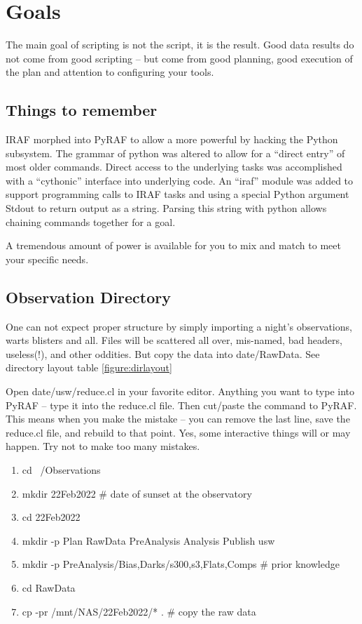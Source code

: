 \section{Goals}

The main goal of scripting is not the script, it is the result. Good
data results do not come from good scripting -- but come from good
planning, good execution of the plan and attention to configuring
your tools.


\subsection{Things to remember}

IRAF  morphed into PyRAF \cite{2006hstc.conf..437G} to allow a more
powerful  by hacking the Python  subsystem. The
grammar of python was altered to allow for a ``direct entry'' of most older
 commands. Direct access to the underlying tasks was
accomplished with a ``cythonic'' interface into underlying code. An ``iraf''
module was added to support programming calls to IRAF tasks and using 
a special Python  argument Stdout to return output as a string.
Parsing this string with python allows chaining  commands together
for a goal.

A tremendous amount of power is available for you to mix and match to meet
your specific needs. 

\subsection{Observation Directory}

One can not expect proper structure by simply importing a night's
observations, warts blisters and all. Files will be scattered all
over, mis-named, bad headers, useless(!), and other oddities. But copy
the data into date/RawData. See directory layout table \ref{figure:dirlayout}

Open date/usw/reduce.cl in your favorite editor. Anything you want
to type into PyRAF -- type it into the reduce.cl file. Then cut/paste
the command to PyRAF. This means when you make the mistake -- you
can remove the last line, save the reduce.cl file, and rebuild
to that point. Yes, some interactive things will or may happen.
Try not to make too many mistakes.

\vspace{-.15cm}
\begin{enumerate}\addtolength{\itemsep}{-0.5\baselineskip}
   \item   cd ~/Observations
   \item   mkdir 22Feb2022 \# date of sunset at the observatory
   \item   cd 22Feb2022
   \item   mkdir -p Plan RawData PreAnalysis Analysis Publish usw
   \item   mkdir -p PreAnalysis/{Bias,Darks/{s300,s3},Flats,Comps} \# prior knowledge
   \item   cd RawData
   \item   cp -pr /mnt/NAS/22Feb2022/* .  \# copy the raw data
\end{enumerate}

